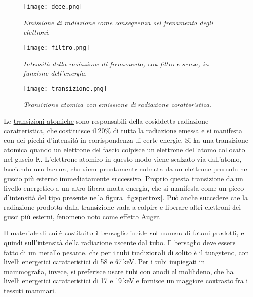 \documentclass{report}
\newcommand{\figref}[1]{figura \ref{#1}}
\numberwithin{equation}{section}
\numberwithin{figure}{section}
\begin{document}
\begin{figure}[htp]
\centering
\texttt{[image: dece.png]}
\caption{\label{fig:dece} \textit{Emissione di radiazione come conseguenza del frenamento degli elettroni}.}
\end{figure}

\begin{figure}[htp]
\centering
\texttt{[image: filtro.png]}
\caption{\label{fig:filtro} \textit{Intensità della radiazione di frenamento, con filtro e senza, in funzione dell'energia}.}
\end{figure}

\begin{figure}[htp]
\centering
\texttt{[image: transizione.png]}
\caption{\label{fig:transizione} \textit{Transizione atomica con emissione di radiazione caratteristica}.}
\end{figure}

Le \underline{transizioni atomiche} sono responsabili della cosiddetta radiazione caratteristica, che costituisce il 20\% di tutta la radiazione emessa e si manifesta con dei picchi d'intensità in corrispondenza di certe energie. Si ha una transizione atomica quando un elettrone del fascio colpisce un elettrone dell'atomo collocato nel guscio K. L'elettrone atomico in questo modo viene scalzato via dall'atomo, lasciando una lacuna, che viene prontamente colmata da un elettrone presente nel guscio più esterno immediatamente successivo. Proprio questa transizione da un livello energetico a un altro libera molta energia, che si manifesta come un picco d'intensità del tipo presente nella \figref{fig:spettrox}. Può anche succedere che la radiazione prodotta dalla transizione vada a colpire e liberare altri elettroni dei gusci più esterni, fenomeno noto come effetto Auger.

Il materiale di cui è costituito il bersaglio incide sul numero di fotoni prodotti, e quindi sull'intensità della radiazione uscente dal tubo. Il bersaglio deve essere fatto di un metallo pesante, che per i tubi tradizionali di solito è il tungsteno, con livelli energetici caratteristici di 58 e 67\,keV. Per i tubi impiegati in mammografia, invece, si preferisce usare tubi con anodi al molibdeno, che ha livelli energetici caratteristici di 17 e 19\,keV e fornisce un maggiore contrasto fra i tessuti mammari.
\end{document}
